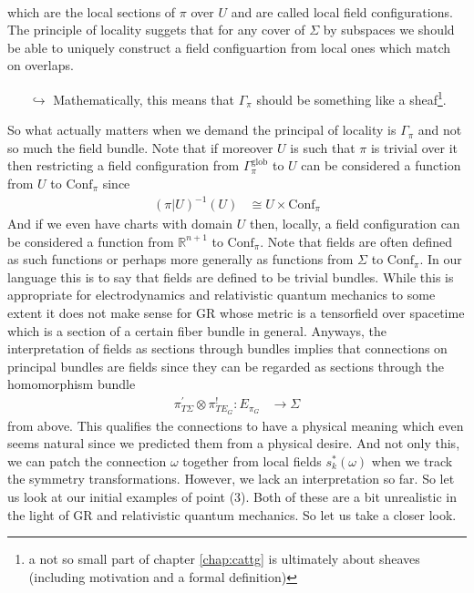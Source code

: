 \begin{enumerate}
\begin{align*}
\end{align*}
which are the local sections of $\pi$ over $U$ and are called local field configurations. The principle of locality suggets that for any cover of $\Sigma$ by subspaces we should be able to uniquely construct a field configuartion from local ones which match on overlaps.
\begin{enumerate}
\item[$\pmb{\hookrightarrow}$]
Mathematically, this means that $\Gamma_{\pi}$ should be something like a sheaf\footnote{a not so small part of chapter \ref{chap:cattg} is ultimately about sheaves (including motivation and a formal definition)}.
\end{enumerate}
So what actually matters when we demand the principal of locality is $\Gamma_{\pi}$ and not so much the field bundle. Note that if moreover $U$ is such that $\pi$ is trivial over it then restricting a field configuration from $\Gamma_{\pi}^{\mathrm{glob}}$ to $U$ can be considered a function from $U$ to $\mathrm{Conf}_{\pi}$ since
\begin{align*}
  (\pi \vert U)^{-1}(U)
  &\cong
  U
  \times
  \mathrm{Conf}_{\pi}
\end{align*}
And if we even have charts with domain $U$ then, locally, a field configuration can be considered a function from $\mathbb{R}^{n+1}$ to $\mathrm{Conf}_{\pi}$. Note that fields are often defined as such functions or perhaps more generally as functions from $\Sigma$ to $\mathrm{Conf}_{\pi}$. In our language this is to say that fields are defined to be trivial bundles. While this is appropriate for electrodynamics and relativistic quantum mechanics to some extent it does not make sense for GR whose metric is a tensorfield over spacetime which is a section of a certain fiber bundle in general. Anyways, the interpretation of fields as sections through bundles implies that connections on principal bundles are fields since they can be regarded as sections through the homomorphism bundle
\begin{align*}
  \pi_{T\Sigma}^{\prime}
  \otimes
  \pi_{TE_{G}}^{!}
  \colon
  E_{\pi_{G}}
  &\rightarrow
  \Sigma
\end{align*}
from above. This qualifies the connections to have a physical meaning which even seems natural since we predicted them from a physical desire. And not only this, we can patch the connection $\omega$ together from local fields $s_{k}^{\ast}(\omega)$ when we track the symmetry transformations. However, we lack an interpretation so far. So let us look at our initial examples of point (3). Both of these are a bit unrealistic in the light of GR and relativistic quantum mechanics. So let us take a closer look.

\end{enumerate}
